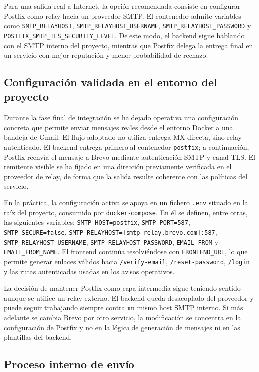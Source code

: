 \documentclass[11pt, a4paper]{article}
\begin{document}
Para una salida real a Internet, la opción recomendada consiste en configurar Postfix como relay hacia un proveedor SMTP. El contenedor admite variables como \texttt{SMTP\_RELAYHOST}, \texttt{SMTP\_RELAYHOST\_USERNAME}, \texttt{SMTP\_RELAYHOST\_PASSWORD} y \texttt{POSTFIX\_SMTP\_TLS\_SECURITY\_LEVEL}. De este modo, el backend sigue hablando con el SMTP interno del proyecto, mientras que Postfix delega la entrega final en un servicio con mejor reputación y menor probabilidad de rechazo.

\subsection{Configuración validada en el entorno del proyecto}

Durante la fase final de integración se ha dejado operativa una configuración concreta que permite enviar mensajes reales desde el entorno Docker a una bandeja de Gmail. El flujo adoptado no utiliza entrega MX directa, sino relay autenticado. El backend entrega primero al contenedor \texttt{postfix}; a continuación, Postfix reenvía el mensaje a Brevo mediante autenticación SMTP y canal TLS. El remitente visible se ha fijado en una dirección previamente verificada en el proveedor de relay, de forma que la salida resulte coherente con las políticas del servicio.

En la práctica, la configuración activa se apoya en un fichero \texttt{.env} situado en la raíz del proyecto, consumido por \texttt{docker-compose}. En él se definen, entre otras, las siguientes variables: \texttt{SMTP\_HOST=postfix}, \texttt{SMTP\_PORT=587}, \texttt{SMTP\_SECURE=false}, \texttt{SMTP\_RELAYHOST=[smtp-relay.brevo.com]:587}, \texttt{SMTP\_RELAYHOST\_USERNAME}, \texttt{SMTP\_RELAYHOST\_PASSWORD}, \texttt{EMAIL\_FROM} y \texttt{EMAIL\_FROM\_NAME}. El frontend continúa resolviéndose con \texttt{FRONTEND\_URL}, lo que permite generar enlaces válidos hacia \texttt{/verify-email}, \texttt{/reset-password}, \texttt{/login} y las rutas autenticadas usadas en los avisos operativos.

La decisión de mantener Postfix como capa intermedia sigue teniendo sentido aunque se utilice un relay externo. El backend queda desacoplado del proveedor y puede seguir trabajando siempre contra un mismo host SMTP interno. Si más adelante se cambia Brevo por otro servicio, la modificación se concentra en la configuración de Postfix y no en la lógica de generación de mensajes ni en las plantillas del backend.

\subsection{Proceso interno de envío}
\end{document}
